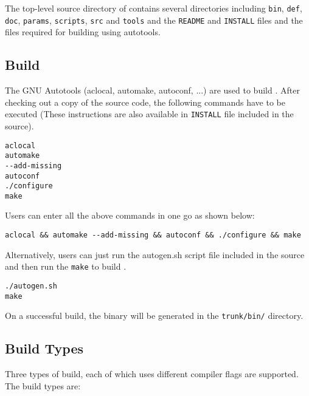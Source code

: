 \ignore
{
  The top-level source directory of \SIM contains several directories including
  \Verb+bin+, \Verb+def+, \Verb+doc+, \Verb+params+, \Verb+scripts+, \Verb+src+ and
  \Verb+tools+ and the \Verb+README+ and \Verb+INSTALL+ files and the files
  required for building \SIM using autotools.
}


\subsection{Build}

The GNU Autotools (aclocal, automake, autoconf, ...) are used to build \SIM.
After checking out a copy of the \SIM source code, the following commands have
to be executed (These instructions are also available in \Verb+INSTALL+ file
    included in the \SIM source).


\begin{Verbatim}
aclocal 
automake 
--add-missing 
autoconf 
./configure 
make
\end{Verbatim}

\noindent
Users can enter all the above commands in one go as shown below:

\begin{Verbatim}
aclocal && automake --add-missing && autoconf && ./configure && make
\end{Verbatim}

\noindent Alternatively, users can just run the autogen.sh script file included
in the \SIM source and then run the \Verb+make+ to build \SIM.

\begin{Verbatim}
./autogen.sh
make
\end{Verbatim}

\noindent
On a successful build, the binary \bin will be generated in the \Verb+trunk/bin/+
directory.




\subsection{Build Types}

Three types of build, each of which uses different compiler flags are
supported. The build types are:

